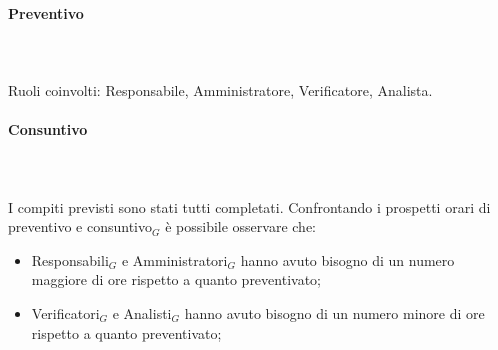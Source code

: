 \paragraph{Preventivo} \hspace{1cm} 
\\ \hspace{1cm} \\
Ruoli coinvolti: Responsabile, Amministratore, Verificatore, Analista.
\begin{table}[H]
\centering
{}
\caption{Preventivo dell'impegno orario di ciascun membro durante il periodo I}
\end{table}

\paragraph{Consuntivo} \hspace{1cm} 
\\ \hspace{1cm} \\
I compiti previsti sono stati tutti completati.
Confrontando i prospetti orari di preventivo e consuntivo$_G$ è possibile osservare che:
\begin{itemize}
    \item Responsabili$_G$ e Amministratori$_G$ hanno avuto bisogno di un numero maggiore di ore rispetto a quanto preventivato;
    \item Verificatori$_G$ e Analisti$_G$ hanno avuto bisogno di un numero minore di ore rispetto a quanto preventivato;
\end{itemize}

